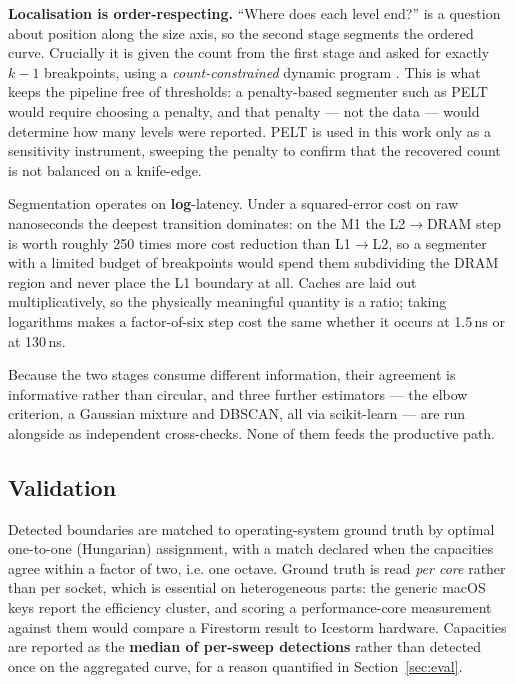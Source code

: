 \documentclass[conference]{IEEEtran}
\begin{document}
\textbf{Localisation is order-respecting.} ``Where does each level end?'' is a
question about position along the size axis, so the second stage segments the
ordered curve. Crucially it is given the count from the first stage and asked for
exactly $k-1$ breakpoints, using a \emph{count-constrained} dynamic program \citep{truong2020}. This
is what keeps the pipeline free of thresholds: a penalty-based segmenter such as
PELT \citep{killick2012} would require choosing a penalty, and that penalty --- not the data ---
would determine how many levels were reported. PELT is used in this work only as
a sensitivity instrument, sweeping the penalty to confirm that the recovered count
is not balanced on a knife-edge.

Segmentation operates on \textbf{log}-latency. Under a squared-error cost on raw
nanoseconds the deepest transition dominates: on the M1 the L2$\rightarrow$DRAM
step is worth roughly 250 times more cost reduction than L1$\rightarrow$L2, so a
segmenter with a limited budget of breakpoints would spend them subdividing the
DRAM region and never place the L1 boundary at all. Caches are laid out
multiplicatively, so the physically meaningful quantity is a ratio; taking
logarithms makes a factor-of-six step cost the same whether it occurs at 1.5\,ns
or at 130\,ns.

Because the two stages consume different information, their agreement is
informative rather than circular, and three further estimators --- the elbow
criterion, a Gaussian mixture and DBSCAN, all via scikit-learn
\citep{pedregosa2011} --- are run alongside as independent cross-checks. None of them feeds the productive path.

\subsection{Validation}

Detected boundaries are matched to operating-system ground truth by optimal
one-to-one (Hungarian) assignment, with a match declared when the capacities agree
within a factor of two, i.e. one octave. Ground truth is read \emph{per core}
rather than per socket, which is essential on heterogeneous parts: the generic
macOS keys report the efficiency cluster, and scoring a performance-core
measurement against them would compare a Firestorm result to Icestorm hardware.
Capacities are reported as the \textbf{median of per-sweep detections} rather
than detected once on the aggregated curve, for a reason quantified in
Section~\ref{sec:eval}.
\end{document}
